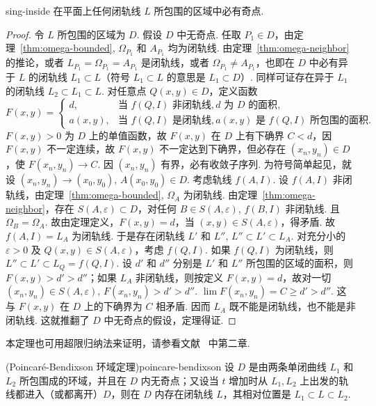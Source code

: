 \begin{theorem}{}{sing-inside}
在平面上任何闭轨线 $L$ 所包围的区域中必有奇点.
\end{theorem}

\begin{proof}
令 $L$ 所包围的区域为 $D$. 假设 $D$ 中无奇点. 任取 $P_1 \in D$，由定理~\ref{thm:omega-bounded}, $\Omega_{P_1}$ 和 $A_{P_1}$ 均为闭轨线. 由定理~\ref{thm:omega-neighbor} 的推论，或者 $L_{P_1} = \Omega_{P_1} = A_{P_1}$ 是闭轨线，或者 $\Omega_{P_1} \neq A_{P_1}$，也即在 $D$ 中必有异于 $L$ 的闭轨线 $L_1 \subset L$（符号 $L_1 \subset L$ 的意思是 $L_1 \subset D$）. 同样可证存在异于 $L_1$ 的闭轨线 $L_2 \subset L_1 \subset L$. 对任意点 $Q(x, y) \in D$，定义函数
\[
F(x, y) = \begin{cases}
d, & \text{当 } f(Q, I) \text{ 非闭轨线}, d \text{ 为 } D \text{ 的面积}, \\
a(x, y), & \text{当 } f(Q, I) \text{ 是闭轨线}, a(x, y) \text{ 是 } f(Q, I) \text{ 所包围的面积}.
\end{cases}
\]
$F(x, y) > 0$ 为 $D$ 上的单值函数，故 $F(x, y)$ 在 $D$ 上有下确界 $C < d$，因 $F(x, y)$ 不一定连续，故 $F(x, y)$ 不一定达到下确界，但必存在 $(x_n, y_n) \in D$，使 $F(x_n, y_n) \to C$. 因 $(x_n, y_n)$ 有界，必有收敛子序列. 为符号简单起见，就设 $(x_n, y_n) \to (x_0, y_0)$, $A(x_0, y_0) \in D$. 考虑轨线 $f(A, I)$. 设 $f(A, I)$ 非闭轨线，由定理~\ref{thm:omega-bounded}, $\Omega_A$ 为闭轨线. 由定理~\ref{thm:omega-neighbor}，存在 $S(A, \varepsilon) \subset D$，对任何 $B \in S(A, \varepsilon)$, $f(B, I)$ 非闭轨线. 且 $\Omega_B = \Omega_A$. 故由定理定义，$F(x, y) = d$，当 $(x, y) \in S(A, \varepsilon)$，得矛盾. 故 $f(A, I) = L_A$ 为闭轨线. 于是存在闭轨线 $L'$ 和 $L''$, $L'' \subset L' \subset L_A$. 对充分小的 $\varepsilon > 0$ 及 $Q(x, y) \in S(A, \varepsilon)$，考虑 $f(Q, I)$. 如果 $f(Q, I)$ 为闭轨线，则 $L'' \subset L' \subset L_Q = f(Q, I)$. 设 $d'$ 和 $d''$ 分别是 $L'$ 和 $L''$ 所包围的区域的面积，则 $F(x, y) > d' > d''$；如果 $L_A$ 非闭轨线，则按定义 $F(x, y) = d$，故对一切 $(x_n, y_n) \in S(A, \varepsilon)$, $F(x_n, y_n) > d' > d''$. $\lim F(x_n, y_n) = C \geq d' > d''$. 这与 $F(x, y)$ 在 $D$ 上的下确界为 $C$ 相矛盾. 因而 $L_A$ 既不能是闭轨线，也不能是非闭轨线. 这就推翻了 $D$ 中无奇点的假设，定理得证.
\end{proof}

本定理也可用超限归纳法来证明，请参看文献~\cite{petrovskii-stepanov-1949} 中第二章.

\begin{theorem}{(Poincaré-Bendixson 环域定理)}{poincare-bendixson}
设 $D$ 是由两条单闭曲线 $L_1$ 和 $L_2$ 所包围成的环域，并且在 $D$ 内无奇点；又设当 $t$ 增加时从 $L_1, L_2$ 上出发的轨线都进入（或都离开）$D$，则在 $D$ 内存在闭轨线 $L$，其相对位置是 $L_1 \subset L \subset L_2$.
\end{theorem}

